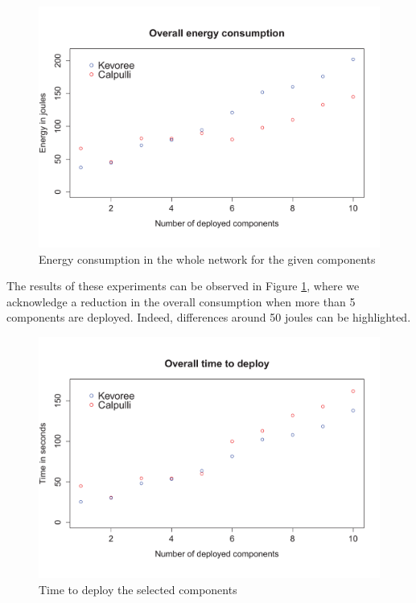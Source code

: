 \begin{figure}[htb]
	\centering
	\includegraphics[width=0.95\columnwidth]{chapters/calpulli.images/energyWithFonts.pdf}
	\caption{Energy consumption in the whole network for the given components} \label{fig:Energy}
\end{figure}

The results of these experiments can be observed in Figure \ref{fig:Energy}, where we acknowledge a reduction in the overall consumption when more than 5 components are deployed.
Indeed, differences around 50 joules can be highlighted. 

\begin{figure}[htb]
	\centering
	\includegraphics[width=0.95\columnwidth]{chapters/calpulli.images/timeWithFonts.pdf}
	\caption{Time to deploy the selected components} \label{fig:Time}
\end{figure}

